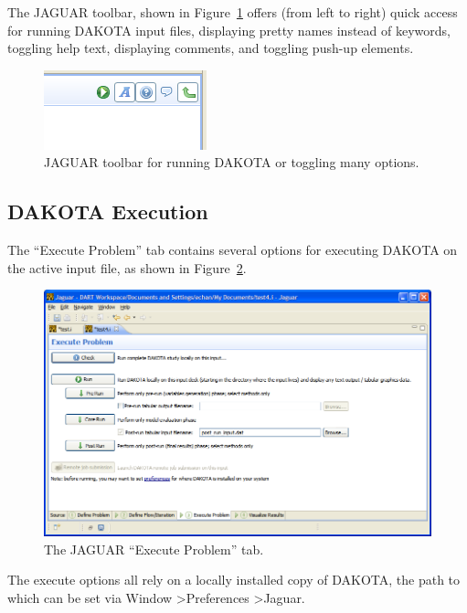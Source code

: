 The JAGUAR toolbar, shown in Figure~\ref{fig:input:jaguar_toolbar}
offers (from left to right) quick access for running DAKOTA input
files, displaying pretty names instead of keywords, toggling help
text, displaying comments, and toggling push-up elements.

\begin{figure}
  \centering
  \includegraphics[scale=0.4]{images/jaguar_toolbar}
  \caption{JAGUAR toolbar for running DAKOTA or toggling many
  options.}
  \label{fig:input:jaguar_toolbar}
\end{figure}


\subsection{DAKOTA Execution}

The ``Execute Problem'' tab contains several options for executing
DAKOTA on the active input file, as shown in
Figure~\ref{fig:input:jag_execute}.
\begin{figure}
  \centering
  \includegraphics[scale=0.4]{images/jag_execute}
  \caption{The JAGUAR ``Execute Problem'' tab.}
  \label{fig:input:jag_execute}
\end{figure}
The execute options all rely on a locally installed copy of DAKOTA,
the path to which can be set via Window \textgreater Preferences
\textgreater Jaguar.

